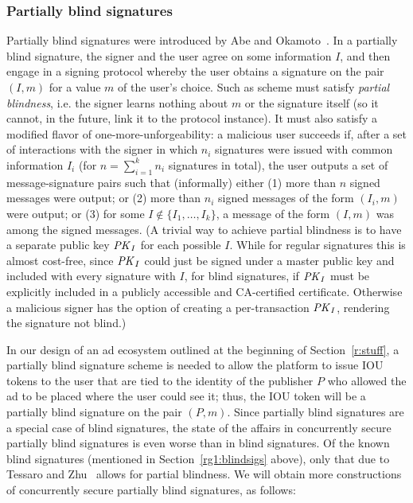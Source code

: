 \subsubsection{Partially blind signatures}
\label{rg1:partially}



Partially blind signatures were introduced by Abe and Okamoto~\cite{C:AbeOka00}.  In a partially blind signature, the signer and the user agree on some information $I$, and then engage in a signing protocol whereby the user obtains a signature on the pair $(I,m)$ for a value $m$ of the user's choice.  Such as scheme must satisfy \textit{partial blindness}, i.e. the signer learns nothing about $m$ or the signature itself (so it cannot, in the future, link it to the protocol instance).  It must also satisfy a modified flavor of one-more-unforgeability: a malicious user succeeds if, after a set of interactions with the signer in which $n_i$ signatures were issued with common information $I_i$ (for $n=\sum_{i=1}^{k}n_i$ signatures in total), the user outputs a set of message-signature pairs such that (informally) either (1) more than $n$ signed messages were output; or (2) more than $n_i$ signed messages of the form $(I_i,m)$ were output; or (3) for some $I\notin \{I_1,\ldots,I_k\}$, a message of the form $(I,m)$ was among the signed messages.  (A trivial way to achieve partial blindness is to have a separate public key $\mathit{PK}_I$ for each possible $I$.  While for regular signatures this is almost cost-free, since $\mathit{PK}_I$ could just be signed under a master public key and included with every signature with $I$, for blind signatures, if $\mathit{PK}_I$ must be explicitly included in a publicly accessible and CA-certified certificate. Otherwise a malicious signer has the option of creating a per-transaction $\mathit{PK}_I$, rendering the signature not blind.)

In our design of an ad ecosystem outlined at the beginning of Section~\ref{r:stuff}, a partially blind signature scheme is needed to allow the platform to issue IOU tokens to the user that are tied to the identity of the publisher $P$ who allowed the ad to be placed where the user could see it; thus, the IOU token will be a partially blind signature on the pair $(P,m)$.  Since partially blind signatures are a special case of blind signatures, the state of the affairs in concurrently secure partially blind signatures is even worse than in blind signatures.  Of the known blind signatures (mentioned in Section~\ref{rg1:blindsigs} above), only that due to Tessaro and Zhu~\cite{EC:TesZhu22} allows for partial blindness.  We will obtain more constructions of concurrently secure partially blind signatures, as follows:

